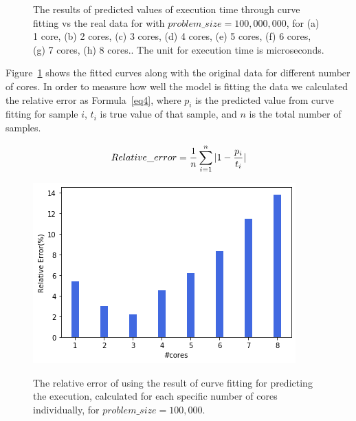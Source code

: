 \begin{figure}[H]
{	\label{fig43:h}}\hfill
	\caption{The results of predicted values of execution time through curve fitting vs the real data for with $problem\_size=100,000,000$, for (a) 1 core, (b) 2 cores, (c) 3 cores, (d) 4 cores, (e) 5 cores, (f) 6 cores, (g) 7 cores, (h) 8 cores.. The unit for execution time is microseconds.}
	\label{fig43}	
\end{figure}


Figure~\ref{fig43} shows the fitted curves along with the original data for different number of cores.
In order to measure how well the model is fitting the data we calculated the relative error as Formula~\ref{eq4}, where $p_i$ is the predicted value from curve fitting for sample $i$, $t_i$ is true value of that sample, and $n$ is the total number of samples.


\begin{equation}{\label{eq4}}
Relative\_{error} = \frac{1}{n}\sum_{i=1}^{n} {|1-\frac{p_i}{t_i}|}
\end{equation}

\begin{figure}[H]
	\centering
	{\includegraphics[scale=.45]{images/hpx_for_loop/fitted/marvin_relative_error_100000000.png}}	\caption{The relative error of using the result of curve fitting for predicting the execution, calculated for each specific number of cores individually, for $problem\_size=100,000$.}\label{fig44}		
\end{figure}



